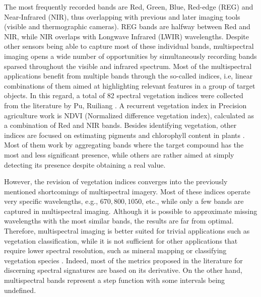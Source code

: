 The most frequently recorded bands are Red, Green, Blue, Red-edge (REG) and Near-Infrared (NIR), thus overlapping with previous and later imaging tools (visible and thermographic cameras). REG bands are halfway between Red and NIR, while NIR overlaps with Longwave Infrared (LWIR) wavelengths. Despite other sensors being able to capture most of these individual bands, multispectral imaging opens a wide number of opportunities by simultaneously recording bands sparsed throughout the visible and infrared spectrum. Most of the multispectral applications benefit from multiple bands through the so-called indices, i.e, linear combinations of them aimed at highlighting relevant features in a group of target objects. In this regard, a total of 82 spectral vegetation indices were collected from the literature by Pu, Ruiliang \cite{pu_hyperspectral_2017}. A recurrent vegetation index in Precision agriculture work is NDVI (Normalized difference vegetation index), calculated as a combination of Red and NIR bands. Besides identifying vegetation, other indices are focused on estimating pigments and chlorophyll content in plants \cite{pu_hyperspectral_2017}. Most of them work by aggregating bands where the target compound has the most and less significant presence, while others are rather aimed at simply detecting its presence despite obtaining a real value.

However, the revision of vegetation indices converges into the previously mentioned shortcomings of multispectral imagery. Most of these indices operate very specific wavelengths, e.g., $670, 800, 1050$, etc., while only a few bands are captured in multispectral imaging. Although it is possible to approximate missing wavelengths with the most similar bands, the results are far from optimal. Therefore, multispectral imaging is better suited for trivial applications such as vegetation classification, while it is not sufficient for other applications that require lower spectral resolution, such as mineral mapping or classifying vegetation species \cite{navulur_multispectral_2006, pu_hyperspectral_2017}. Indeed, most of the metrics proposed in the literature for discerning spectral signatures are based on its derivative. On the other hand, multispectral bands represent a step function with some intervals being undefined.

